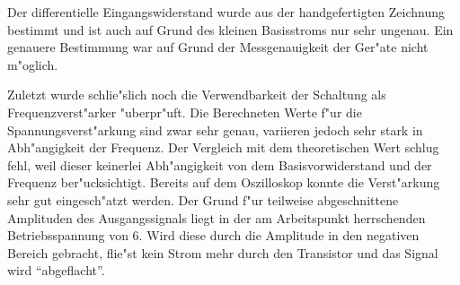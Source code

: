 \documentclass[a4paper,10pt]{article}
\begin{document}
Der differentielle Eingangswiderstand wurde aus der handgefertigten Zeichnung bestimmt und ist auch auf Grund des kleinen Basisstroms nur sehr ungenau. Ein genauere Bestimmung war auf Grund der Messgenauigkeit der Ger"ate nicht m"oglich.

Zuletzt wurde schlie"slich noch die Verwendbarkeit der Schaltung als Frequenzverst"arker "uberpr"uft. Die Berechneten Werte f"ur die Spannungsverst"arkung sind zwar sehr genau, variieren jedoch sehr stark in Abh"angigkeit der Frequenz. Der Vergleich mit dem theoretischen Wert schlug fehl, weil dieser keinerlei Abh"angigkeit von dem Basisvorwiderstand und der Frequenz ber"ucksichtigt. Bereits auf dem Oszilloskop konnte die Verst"arkung sehr gut eingesch"atzt werden. Der Grund f"ur teilweise abgeschnittene Amplituden des Ausgangssignals liegt in der am Arbeitspunkt herrschenden Betriebsspannung von \unit{6}{\volt}. Wird diese durch die Amplitude in den negativen Bereich gebracht, flie"st kein Strom mehr durch den Transistor und das Signal wird "`abgeflacht"'.
\end{document}
